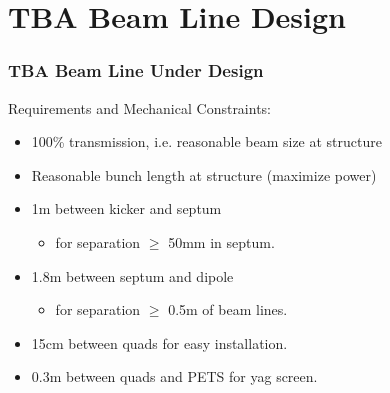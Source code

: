 \documentclass[professionalfonts,t]{beamer}
\begin{document}
\section{TBA Beam Line Design}
\begin{frame}
\frametitle{TBA Beam Line Under Design}
\begin{tikzpicture}[scale=\textwidth/22cm, text=black]

\end{tikzpicture}

\vspace{-1.5em}

Requirements and Mechanical Constraints:
\begin{itemize}
	\item 100\% transmission, i.e. reasonable beam size at structure
	\item Reasonable bunch length at structure (maximize power)
	\item 1m between kicker and septum
	\begin{itemize}
		\item for separation $\ge$ 50mm in septum. 
	\end{itemize}
	\item 1.8m between septum and dipole
	\begin{itemize}
		\item for separation $\ge$ 0.5m of beam lines.
	\end{itemize}
	\item 15cm between quads for easy installation. 
	\item 0.3m between quads and PETS for yag screen.  
\end{itemize}
\end{frame}
\end{document}
